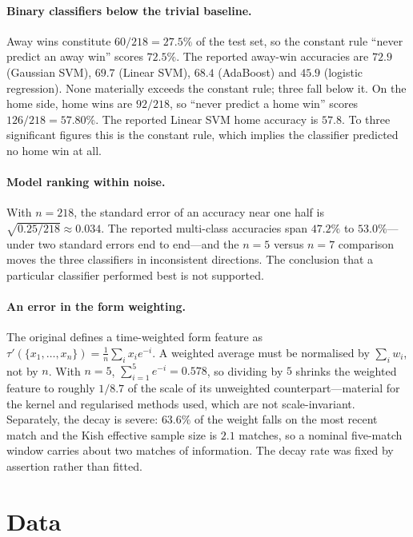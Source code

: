 \documentclass[11pt]{article}
\begin{document}
\paragraph{Binary classifiers below the trivial baseline.} Away wins constitute
$60/218 = 27.5\%$ of the test set, so the constant rule ``never predict an away
win'' scores $72.5\%$. The reported away-win accuracies are $72.9$ (Gaussian
SVM), $69.7$ (Linear SVM), $68.4$ (AdaBoost) and $45.9$ (logistic regression).
None materially exceeds the constant rule; three fall below it. On the home
side, home wins are $92/218$, so ``never predict a home win'' scores
$126/218 = 57.80\%$. The reported Linear SVM home accuracy is $57.8$. To three
significant figures this is the constant rule, which implies the classifier
predicted no home win at all.

\paragraph{Model ranking within noise.} With $n = 218$, the standard error of an
accuracy near one half is $\sqrt{0.25/218} \approx 0.034$. The reported
multi-class accuracies span $47.2\%$ to $53.0\%$---under two standard errors end
to end---and the $n=5$ versus $n=7$ comparison moves the three classifiers in
inconsistent directions. The conclusion that a particular classifier performed
best is not supported.

\paragraph{An error in the form weighting.} The original defines a
time-weighted form feature as $\tau'(\{x_1,\dots,x_n\}) = \frac{1}{n}\sum_i x_i
e^{-i}$. A weighted average must be normalised by $\sum_i w_i$, not by $n$. With
$n=5$, $\sum_{i=1}^{5} e^{-i} = 0.578$, so dividing by $5$ shrinks the weighted
feature to roughly $1/8.7$ of the scale of its unweighted counterpart---material
for the kernel and regularised methods used, which are not scale-invariant.
Separately, the decay is severe: $63.6\%$ of the weight falls on the most recent
match and the Kish effective sample size is $2.1$ matches, so a nominal
five-match window carries about two matches of information. The decay rate was
fixed by assertion rather than fitted.

\section{Data}
\label{sec:data}
\end{document}
